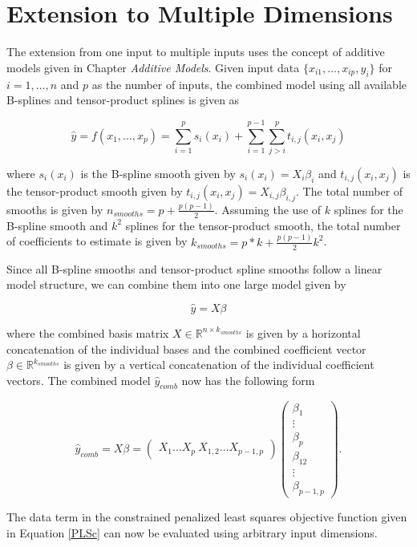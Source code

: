 \documentclass[10pt,a4paper]{article}
\begin{document}
	\section{Extension to Multiple Dimensions}
	
	The extension from one input to multiple inputs uses the concept of additive models given in Chapter \emph{Additive Models}. Given input data $\{ x_{i1}, \dots, x_{ip}, y_i\}$ for $i = 1, \dots, n$ and $p$ as the number of inputs, the combined model using all available B-splines and tensor-product splines is given as
	
	$$\hat y = f(x_1,..., x_p) = \sum_{i=1}^p s_i(x_i) + \sum_{i=1}^{p-1} \sum_{j>i}^p t_{i,j}(x_i, x_j) $$
	
	where $s_i(x_i)$ is the B-spline smooth given by $s_i(x_i) = X_i \beta_i$ and $t_{i, j}(x_i,x_j)$ is the tensor-product smooth given by $t_{i, j}(x_i,x_j) = X_{i,j} \beta_{i,j}$. The total number of smooths is given by $n_{smooths} = p + \frac{p(p-1)}{2}$.  Assuming the use of $k$ splines for the B-spline smooth and $k^2$ splines for the tensor-product smooth, the total number of coefficients to estimate is given by $k_{smooths} = p*k + \frac{p(p-1)}{2}k^2$. \cite{fahrmeir2013regression}
	
	Since all B-spline smooths and tensor-product spline smooths follow a linear model structure, we can combine them into one large model given by
	
	$$\hat y = X \beta$$
	
	where the combined basis matrix $X \in \mathbb{R}^{n \times k_{smooths}}$ is given by a horizontal concatenation of the individual bases and the combined coefficient vector $\beta \in \mathbb{R}^{k_{smooths}}$ is given by a vertical concatenation of the individual coefficient vectors. The combined model $\hat y_{comb}$ now has the following form
		
	$$\hat y_{comb} = X \beta = \begin{pmatrix} X_1 \dots X_p \ X_{1,2} \dots X_{p-1,p}\end{pmatrix} \begin{pmatrix} \beta_1 \\ \vdots \\ \beta_p \\ \beta_{12} \\ \vdots \\ \beta_{p-1, p}  \end{pmatrix}.$$
	
	The data term in the constrained penalized least squares objective function given in Equation \ref{PLSc} can now be evaluated using arbitrary input dimensions. 
	
\end{document}
